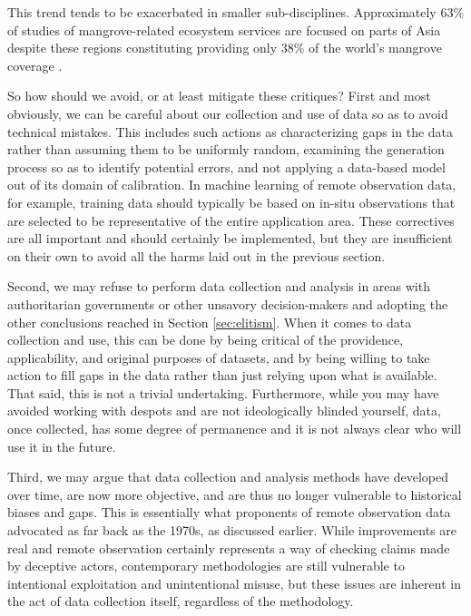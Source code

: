 This trend tends to be exacerbated in smaller sub-disciplines. Approximately 63\% of studies of mangrove-related ecosystem services are focused on parts of Asia despite these regions constituting providing only 38\% of the world’s mangrove coverage \cite{veghMangroveEcosystemServices2014}.

So how should we avoid, or at least mitigate these critiques? First and most obviously, we can be careful about our collection and use of data so as to avoid technical mistakes. This includes such actions as characterizing gaps in the data rather than assuming them to be uniformly random, examining the generation process so as to identify potential errors, and not applying a data-based model out of its domain of calibration. In machine learning of remote observation data, for example, training data should typically be based on in-situ observations that are selected to be representative of the entire application area. These correctives are all important and should certainly be implemented, but they are insufficient on their own to avoid all the harms laid out in the previous section.

Second, we may refuse to perform data collection and analysis in areas with authoritarian governments or other unsavory decision-makers and adopting the other conclusions reached in Section \ref{sec:elitism}. When it comes to data collection and use, this can be done by being critical of the providence, applicability, and original purposes of datasets, and by being willing to take action to fill gaps in the data rather than just relying upon what is available. That said, this is not a trivial undertaking. Furthermore, while you may have avoided working with despots and are not ideologically blinded yourself, data, once collected, has some degree of permanence and it is not always clear who will use it in the future.

Third, we may argue that data collection and analysis methods have developed over time, are now more objective, and are thus no longer vulnerable to historical biases and gaps. This is essentially what proponents of remote observation data advocated as far back as the 1970s, as discussed earlier. While improvements are real and remote observation certainly represents a way of checking claims made by deceptive actors, contemporary methodologies are still vulnerable to intentional exploitation and unintentional misuse, but these issues are inherent in the act of data collection itself, regardless of the methodology.

